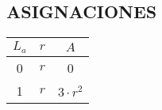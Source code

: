 \documentclass[a4paper]{article}
\begin{document}
\begin{flushleft}
\begin{figure}[ht]
\begin{tikzpicture}
      		   	\end{tikzpicture}
      		   \end{figure}
      		   
      		 
      		   
      		   \begin{table}[ht]
      		   	\centering
      		   	  \subsection*{ASIGNACIONES}
      		   	\begin{tabular}{|c|c|c|}
      		   		\hline
      		   		$L_{a}$ & $r$ & $A$ \\
      		   		\hline
      		   		0 & $r$ & 0 \\
      		   		\hline
      		   		1 & $r$ & $3\cdot r^2$ \\
      		   		\hline
      		   	\end{tabular}
      		   
      		   \end{table}
      		   
      		   
      		   
	 \end{flushleft}
	 
	 
\end{document}
